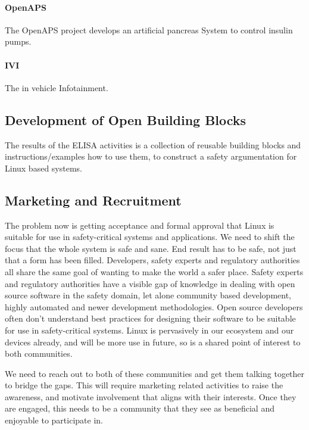 \documentclass[12pt]{../Common_files/ElisaPaper}
\begin{document}
\paragraph{OpenAPS}

The OpenAPS project develops an artificial pancreas System to control insulin pumps.
%
\label{sssec:OpenAPS}

\paragraph{IVI}
\label{sssec:IVI}
The in vehicle Infotainment.

\subsection{Development of Open Building Blocks}
The results of the ELISA activities is a collection of reusable building blocks and instructions/examples how to use them, to construct a safety argumentation for Linux based systems.

\subsection{Marketing and Recruitment}
The problem now is getting acceptance and formal approval that Linux is suitable for use in safety-critical systems and applications.
We need to shift the focus that the whole system is safe and sane.
End result has to be safe,  not just that a form has been filled.
Developers, safety experts and regulatory authorities all share the same goal of wanting to make the world a safer place.
Safety experts and regulatory authorities have a visible gap of knowledge in dealing with open source software in the safety domain,  let alone community based development,  highly automated and newer development methodologies.
Open source developers often don’t understand best practices for designing their software to be suitable for use in safety-critical systems.
Linux is pervasively in our ecosystem and our devices already,  and will be more use in future, so is a shared point of interest to both communities.   


We need to reach out to both of these communities and get them talking together to bridge the gaps.
This will require marketing related activities to raise the awareness, and motivate involvement that aligns with their interests.
Once they are engaged, this needs to be a community that they see as beneficial and enjoyable to participate in. 
\end{document}
